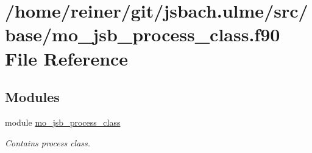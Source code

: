 \hypertarget{mo__jsb__process__class_8f90}{}\section{/home/reiner/git/jsbach.ulme/src/base/mo\+\_\+jsb\+\_\+process\+\_\+class.f90 File Reference}
\label{mo__jsb__process__class_8f90}
\subsection*{Modules}
\begin{DoxyCompactItemize}
\item 
module \hyperlink{namespacemo__jsb__process__class}{mo\+\_\+jsb\+\_\+process\+\_\+class}
\begin{DoxyCompactList}\small\item\em Contains process class. \end{DoxyCompactList}\end{DoxyCompactItemize}
